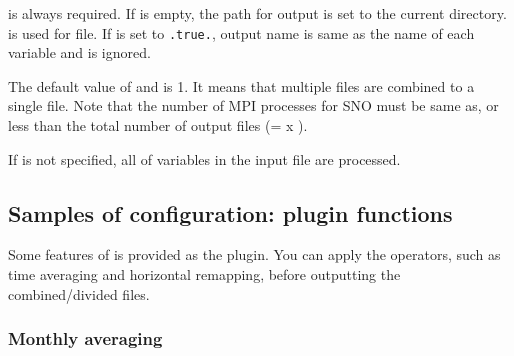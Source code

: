 
 is always required. If  is empty, the path for output is set to the current directory.
 is used for \scalenetcdf file. If  is set to \verb|.true.|, output name is same as the name of each variable and  is ignored.

The default value of  and  is 1. It means that multiple files are combined to a single file.
Note that the number of MPI processes for SNO must be same as, or less than the total number of output files (=  x ).

If  is not specified, all of variables in the input file are processed.

\subsection{Samples of configuration: plugin functions}

Some features of \sno is provided as the plugin. You can apply the operators, such as time averaging and horizontal remapping, before outputting the combined/divided files.

\subsubsection{Monthly averaging}


